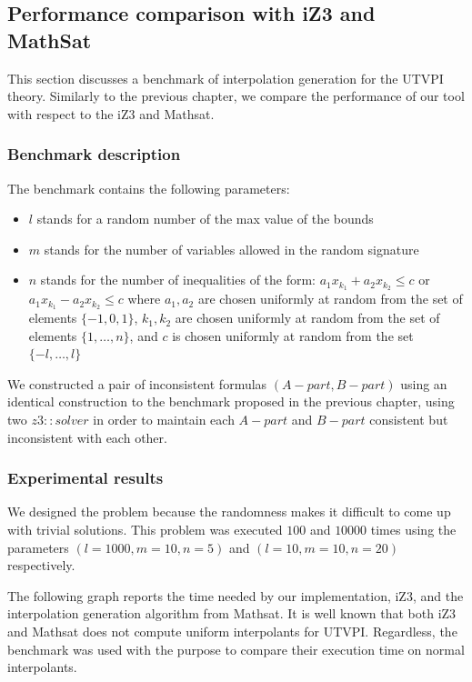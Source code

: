 \subsection{Performance comparison with iZ3 and MathSat}\label{performance_oct}

This section discusses a benchmark of interpolation 
generation for the UTVPI theory. Similarly to the previous chapter,
we compare the performance of our tool with respect to the
iZ3 and Mathsat.

\subsubsection{Benchmark description}

The benchmark contains the following parameters:

\begin{itemize}
  \item $l$ stands for a random number of the max value
    of the bounds
  \item $m$ stands for the number of variables allowed
    in the random signature
  \item $n$ stands for the number of inequalities of the
    form: $a_1 x_{k_1} + a_2 x_{k_2} \leq c$
    or $a_1 x_{k_1} - a_2 x_{k_2} \leq c$
    where $a_1, a_2$ are chosen
    uniformly at random from the set of elements
    $\{-1, 0, 1\}$, $k_1, k_2$ are chosen uniformly
    at random from the set of elements 
    $\{1, \dots, n\}$, and $c$ is chosen uniformly
    at random from the set $\{-l, \dots, l\}$
\end{itemize}

We constructed a pair of inconsistent formulas $(A-part, B-part)$
using an identical construction to the benchmark proposed in 
the previous chapter, using two $z3: :solver$ in order to maintain
each $A-part$ and $B-part$ consistent but inconsistent with 
each other. 

\subsubsection{Experimental results}

We designed the problem because the randomness makes it
difficult to come up with trivial solutions. This problem 
was executed $100$ and $10000$ times using the parameters
$(l = 1000, m = 10, n = 5)$ and 
$(l = 10, m = 10, n = 20)$ respectively.

The following graph reports the time needed
by our implementation, iZ3, and the interpolation 
generation algorithm from Mathsat. 
It is well known that both iZ3 and Mathsat does not
compute uniform interpolants for UTVPI. 
Regardless, the benchmark
was used with the purpose to compare their execution time
on normal interpolants.

